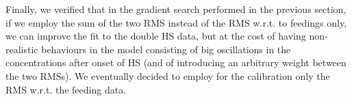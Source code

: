 \documentclass[oneside, 10pt, a4paper, twocolumn]{article}
\begin{document}
Finally, we verified that in the gradient search performed in the previous section, if we employ the sum of the two RMS instead of the RMS w.r.t. to feedings only, we can improve the fit to the double HS data, but at the cost of having non-realistic behaviours in the model consisting of big oscillations in the concentrations after onset of HS (and of introducing an arbitrary weight between the two RMSs). We eventually decided to employ for the calibration only the RMS w.r.t. the feeding data.







\end{document}
